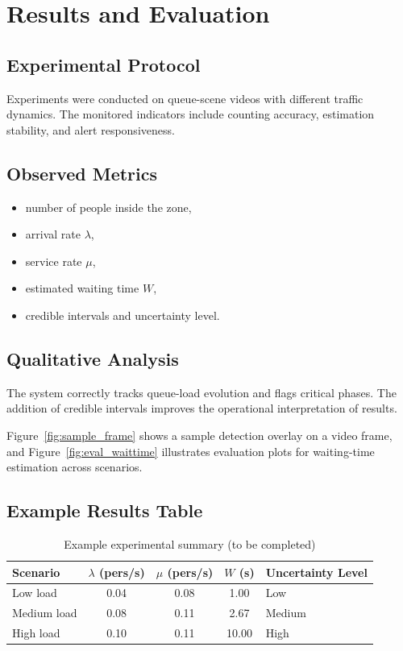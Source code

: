 \chapter{Results and Evaluation}
\chaptertoc

\section{Experimental Protocol}
Experiments were conducted on queue-scene videos with different traffic dynamics.
The monitored indicators include counting accuracy, estimation stability, and alert responsiveness.

\section{Observed Metrics}
\begin{itemize}
    \item number of people inside the zone,
    \item arrival rate $\lambda$,
    \item service rate $\mu$,
    \item estimated waiting time $W$,
    \item credible intervals and uncertainty level.
\end{itemize}

\section{Qualitative Analysis}
The system correctly tracks queue-load evolution and flags critical phases.
The addition of credible intervals improves the operational interpretation of results.

Figure~\ref{fig:sample_frame} shows a sample detection overlay on a video frame, and Figure~\ref{fig:eval_waittime}
illustrates evaluation plots for waiting-time estimation across scenarios.

\section{Example Results Table}
\begin{table}[H]
    \centering
    \caption{Example experimental summary (to be completed)}
    \begin{tabularx}{\textwidth}{lcccX}
        \toprule
        Scenario & $\lambda$ (pers/s) & $\mu$ (pers/s) & $W$ (s) & Uncertainty Level \\
        \midrule
        Low load & 0.04 & 0.08 & 1.00 & Low \\
        Medium load & 0.08 & 0.11 & 2.67 & Medium \\
        High load & 0.10 & 0.11 & 10.00 & High \\
        \bottomrule
    \end{tabularx}
\end{table}

